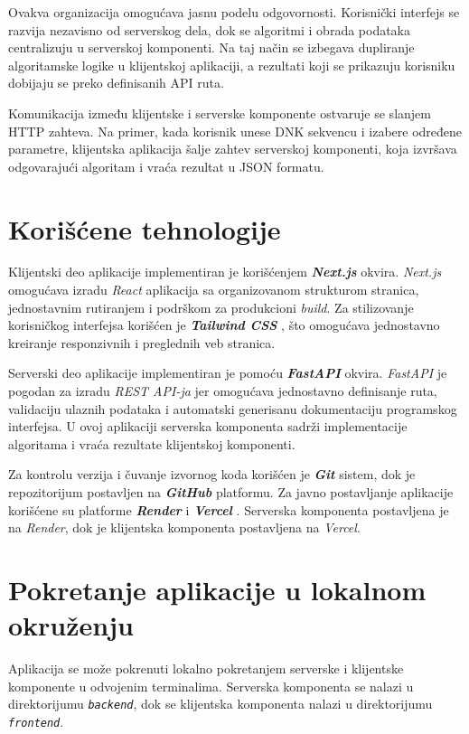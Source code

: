 \documentclass[12pt,oneside]{memoir}
\begin{document}
Ovakva organizacija omogućava jasnu podelu odgovornosti. Korisnički interfejs se razvija nezavisno od serverskog dela, dok se algoritmi i obrada podataka centralizuju u serverskoj komponenti. Na taj način se izbegava dupliranje algoritamske logike u klijentskoj aplikaciji, a rezultati koji se prikazuju korisniku dobijaju se preko definisanih API ruta.

Komunikacija između klijentske i serverske komponente ostvaruje se slanjem HTTP zahteva. Na primer, kada korisnik unese DNK sekvencu i izabere određene parametre, klijentska aplikacija šalje zahtev serverskoj komponenti, koja izvršava odgovarajući algoritam i vraća rezultat u JSON formatu.


\section{Korišćene tehnologije}

Klijentski deo aplikacije implementiran je korišćenjem \textbf{\textit{Next.js}} okvira.\textit{ Next.js} omogućava izradu \textit{React} aplikacija sa organizovanom strukturom stranica, jednostavnim rutiranjem i podrškom za produkcioni \textit{build}. Za stilizovanje korisničkog interfejsa korišćen je \textbf{\textit{Tailwind CSS}} \cite{tailwind}, što omogućava jednostavno kreiranje responzivnih i preglednih veb stranica.

Serverski deo aplikacije implementiran je pomoću \textbf{\textit{FastAPI}} okvira. \textit{FastAPI} je pogodan za izradu \textit{REST API-ja} jer omogućava jednostavno definisanje ruta, validaciju ulaznih podataka i automatski generisanu dokumentaciju programskog interfejsa. U ovoj aplikaciji serverska komponenta sadrži implementacije algoritama i vraća rezultate klijentskoj komponenti.

Za kontrolu verzija i čuvanje izvornog koda korišćen je \textbf{\textit{Git}} sistem, dok je repozitorijum postavljen na \textbf{\textit{GitHub}} platformu. Za javno postavljanje aplikacije korišćene su platforme \textbf{\textit{Render}} \cite{render} i \textbf{\textit{Vercel}} \cite{vercel}. Serverska komponenta postavljena je na \textit{Render}, dok je klijentska komponenta postavljena na \textit{Vercel}.


\section{Pokretanje aplikacije u lokalnom okruženju}

Aplikacija se može pokrenuti lokalno pokretanjem serverske i klijentske komponente u odvojenim terminalima. Serverska komponenta se nalazi u direktorijumu \texttt{\textit{backend}}, dok se klijentska komponenta nalazi u direktorijumu \texttt{\textit{frontend}}.
\end{document}
